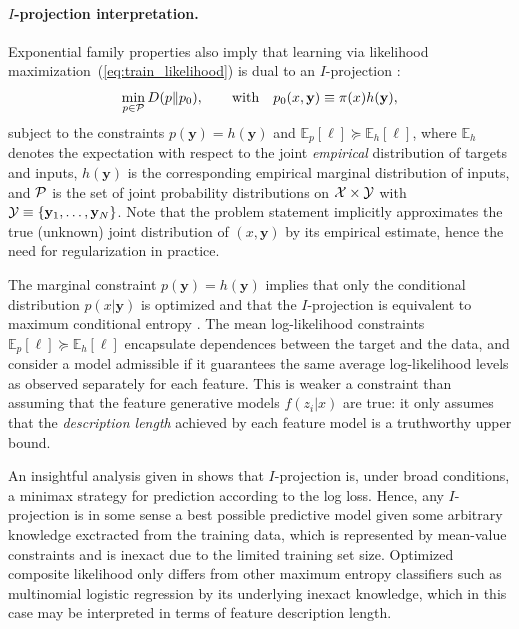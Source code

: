 \documentclass[english]{scrartcl}
\def\y{{\mathbf{y}}}
\newcommand{\bell}{{\boldsymbol{\ell}}}
\newcommand{\E}{\mathbb{E}}
\begin{document}
\paragraph{$I$-projection interpretation.}

Exponential family properties also imply that learning via likelihood maximization~(\ref{eq:train_likelihood}) is dual to an $I$-projection \cite{Csiszar-84}: 
\begin{equation}
\label{eq:i_proj}
\min_{p\in{\cal P}} D(p\|p_0),
\qquad \text{with} \quad
p_0(x,\y) \equiv \pi(x)h(\y),
\end{equation}
subject to the constraints $p(\y)=h(\y)$ and $\E_p[\bell] \succeq \E_h[\bell]$, where $\E_h$ denotes the expectation with respect to the joint {\em empirical} distribution of targets and inputs, $h(\y)$ is the corresponding empirical marginal distribution of inputs, and ${\cal P}$ is the set of joint probability distributions on ${\cal X}\times {\cal Y}$ with ${\cal Y}\equiv\{\y_1,\ldots,\y_N\}$. Note that the problem statement implicitly approximates the true (unknown) joint distribution of $(x,\y)$ by its empirical estimate, hence the need for regularization in practice.

The marginal constraint $p(\y)=h(\y)$ implies that only the conditional distribution $p(x|\y)$ is optimized and that the $I$-projection is equivalent to maximum conditional entropy \cite{BergerA-96}. The mean log-likelihood constraints $\E_p[\bell] \succeq \E_h[\bell]$ encapsulate dependences between the target and the data, and consider a model admissible if it guarantees the same average log-likelihood levels as observed separately for each feature. This is weaker a constraint than assuming that the feature generative models $f(z_i|x)$ are true: it only assumes that the {\em description length} \cite{Grunwald-07} achieved by each feature model is a truthworthy upper bound.


An insightful analysis given in \cite{Grunwald-04} shows that $I$-projection is, under broad conditions, a minimax strategy for prediction according to the log loss. Hence, any $I$-projection is in some sense a best possible predictive model given some arbitrary knowledge exctracted from the training data, which is represented by mean-value constraints and is inexact due to the limited training set size. Optimized composite likelihood only differs from other maximum entropy classifiers such as multinomial logistic regression by its underlying inexact knowledge, which in this case may be interpreted in terms of  feature description length.
\end{document}
